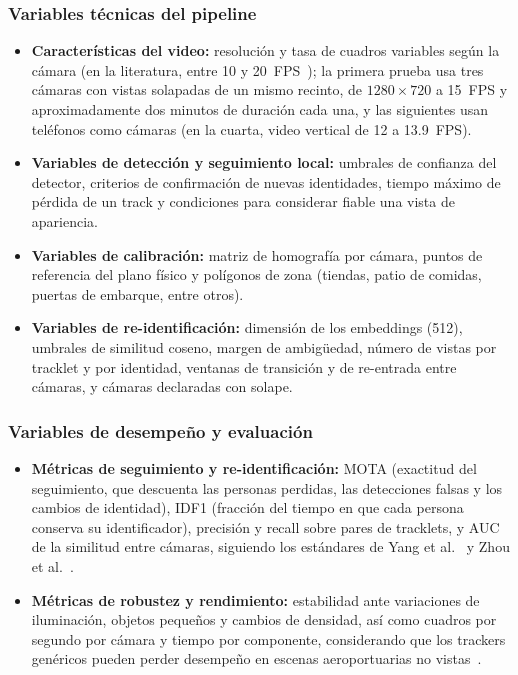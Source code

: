 \documentclass[12pt,a4paper]{article}
\begin{document}
\subsubsection{Variables técnicas del pipeline}
\begin{itemize}
    \item \textbf{Características del video:} resolución y tasa de
    cuadros variables según la cámara (en la literatura, entre 10 y
    20~FPS~\cite{mendes2023,zhao2023}); la primera prueba usa tres cámaras
    con vistas solapadas de un mismo recinto, de $1280\times720$ a
    15~FPS y aproximadamente dos minutos de duración cada una, y las
    siguientes usan teléfonos como cámaras (en la cuarta, video vertical
    de 12 a 13.9~FPS).
    \item \textbf{Variables de detección y seguimiento local:} umbrales
    de confianza del detector, criterios de confirmación de nuevas
    identidades, tiempo máximo de pérdida de un track y condiciones para
    considerar fiable una vista de apariencia.
    \item \textbf{Variables de calibración:} matriz de homografía por
    cámara, puntos de referencia del plano físico y polígonos de zona
    (tiendas, patio de comidas, puertas de embarque, entre otros).
    \item \textbf{Variables de re-identificación:} dimensión de los
    embeddings (512), umbrales de similitud coseno, margen de
    ambigüedad, número de vistas por tracklet y por identidad, ventanas
    de transición y de re-entrada entre cámaras, y cámaras declaradas
    con solape.
\end{itemize}

\subsubsection{Variables de desempeño y evaluación}
\begin{itemize}
    \item \textbf{Métricas de seguimiento y re-identificación:} MOTA
    (exactitud del seguimiento, que descuenta las personas perdidas, las
    detecciones falsas y los cambios de identidad), IDF1 (fracción del tiempo
    en que cada persona conserva su identificador), precisión y recall sobre
    pares de tracklets, y AUC de la
    similitud entre cámaras, siguiendo los estándares de Yang et
    al.~\cite{yang2023} y Zhou et al.~\cite{zhou2026}.
    \item \textbf{Métricas de robustez y rendimiento:} estabilidad ante
    variaciones de iluminación, objetos pequeños y cambios de densidad,
    así como cuadros por segundo por cámara y tiempo por componente,
    considerando que los trackers genéricos pueden perder desempeño en
    escenas aeroportuarias no vistas~\cite{zhou2026}.
\end{itemize}
\end{document}
